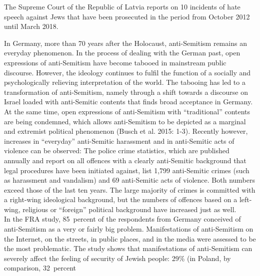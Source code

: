 The Supreme Court of the Republic of Latvia reports on 10 incidents of hate speech against Jews that have been prosecuted in the period from October 2012 until March 2018. \par
In Germany, more than 70 years after the Holocaust, anti-Semitism remains an everyday phenomenon. In the process of dealing with the German past, open expressions of anti-Semitism have become tabooed in mainstream public discourse. However, the ideology continues to fulfil the function of a socially and psychologically relieving interpretation of the world. The tabooing has led to a transformation of anti-Semitism, namely through a shift towards a discourse on Israel loaded with anti-Semitic contents that finds broad acceptance in Germany. At the same time, open expressions of anti-Semitism with ``traditional'' contents are being condemned, which allows anti-Semitism to be depicted as a marginal and extremist political phenomenon (Busch et al. 2015: 1-3). Recently however, increases in ``everyday'' anti-Semitic harassment and in anti-Semitic acts of violence can be observed: The police crime statistics, which are published annually and report on all offences with a clearly anti-Semitic background that legal procedures have been initiated against, list 1,799 anti-Semitic crimes (such as harassment and vandalism) and 69 anti-Semitic acts of violence. Both numbers exceed those of the last ten years. The large majority of crimes is committed with a right-wing ideological background, but the numbers of offences based on a left-wing, religious or ``foreign'' political background have increased just as well. \\
In the FRA study, 85\ percent of the respondents from Germany conceived of anti-Semitism as a very or fairly big problem. Manifestations of anti-Semitism on the Internet, on the streets, in public places, and in the media were assessed to be the most problematic. The study shows that manifestations of anti-Semitism can severely affect the feeling of security of Jewish people: 29\% (in Poland, by comparison, 32\ percent%
